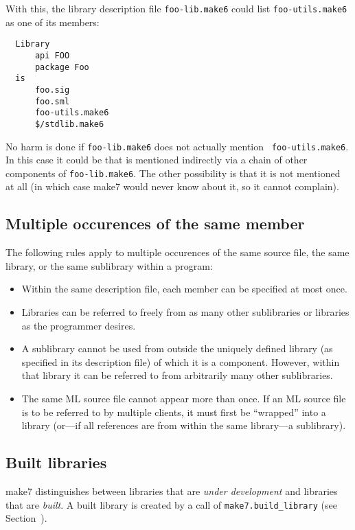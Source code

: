With this, the library description file {\tt foo-lib.make6} could list
{\tt foo-utils.make6} as one of its members:

\begin{verbatim}
  Library
      api FOO
      package Foo
  is
      foo.sig
      foo.sml
      foo-utils.make6
      $/stdlib.make6
\end{verbatim}

No harm is done if {\tt foo-lib.make6} does not actually mention {\tt
foo-utils.make6}.  In this case it could be that is mentioned indirectly via a chain of other components
of {\tt foo-lib.make6}.  The other possibility is that it is not
mentioned at all (in which case make7 would never know about it, so it
cannot complain).

\subsection{Multiple occurences of the same member}
\label{sec:multioccur}

The following rules apply to multiple occurences of the same source
file, the same library, or the same sublibrary within a program:

\begin{itemize}
\item Within the same description file, each member can be specified
at most once.
\item Libraries can be referred to freely from as many other sublibraries or
libraries as the programmer desires.
\item A sublibrary cannot be used from outside the uniquely defined library
(as specified in its description file) of which it is a component.
However, within that library it can be referred to from arbitrarily
many other sublibraries.
\item The same ML source file cannot appear more than once.  If an ML
source file is to be referred to by multiple clients, it must first be
``wrapped'' into a library (or---if all references are from within the
same library---a sublibrary).
\end{itemize}

\subsection{Built libraries}
\label{sec:built}

make7 distinguishes between libraries that are {\em under development}
and libraries that are {\em built}.  A built library is created by a
call of {\tt make7.build_library} (see Section~).

